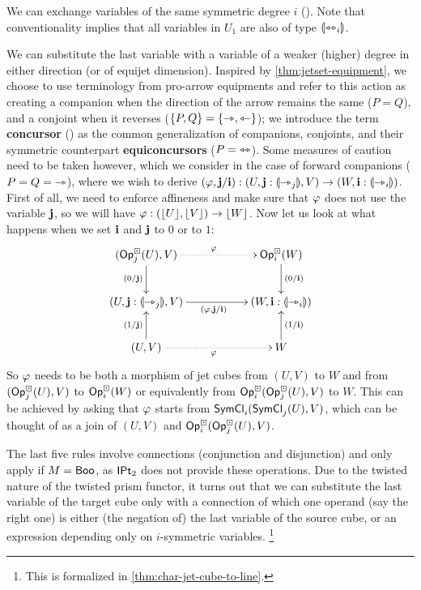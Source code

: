 \documentclass[a4paper]{memoir}
\begin{document}
We can exchange variables of the same symmetric degree $i$ ().
Note that conventionality implies that all variables in $U_1$ are also of type ${\llparenthesis \leftrightarrowtriangle_i \rrparenthesis}$.

We can substitute the last variable with a variable of a weaker (higher) degree in either direction (or of equijet dimension).
Inspired by \cref{thm:jetset-equipment}, we choose to use terminology from pro-arrow equipments and refer to this action as creating a companion when the direction of the arrow remains the same ($P = Q$), and a conjoint when it reverses ($\mathopen{}\left\{ P, Q \right\}\mathclose{} = \mathopen{}\left\{ \rightarrowtriangle, \leftarrowtriangle \right\}\mathclose{}$); we introduce the term \textbf{concursor} () as the common generalization of companions, conjoints, and their symmetric counterpart \textbf{equiconcursors} ($P = {\leftrightarrowtriangle}$).
Some measures of caution need to be taken however, which we consider in the case of forward companions ($P = Q = {\rightarrowtriangle}$), where we wish to derive $(\varphi, \mathbf{j} / \mathbf{i}) : (U, \mathbf{j} : {\llparenthesis \rightarrowtriangle_j \rrparenthesis}, V) \to (W, \mathbf{i} : {\llparenthesis \rightarrowtriangle_i \rrparenthesis})$.
First of all, we need to enforce affineness and make sure that $\varphi$ does not use the variable $\mathbf{j}$, so we will have $\varphi : (\mathopen{}\left\lfloor U \right\rfloor\mathclose{}, \mathopen{}\left\lfloor V \right\rfloor\mathclose{}) \to \mathopen{}\left\lfloor W \right\rfloor\mathclose{}$.
Now let us look at what happens when we set $\mathbf{i}$ and $\mathbf{j}$ to $0$ or to $1$:
\[
	\xymatrix{
		(\Opcube_j(U), V)
			\ar[d]_{(0/\dm j)}
			\ar@{.>}[rr]^\vfi
		&&
		\Opcube_i(W)
			\ar[d]^{(0/\dm i)}
		\\
		(U, \dm j : \rival{\jet_j}, V)
			\ar[rr]_{(\vfi, \dm j / \dm i)}
		&& (W, \dm i : \rival{\jet_i})
		\\
		(U, V)
			\ar[u]^{(1/\dm j)}
			\ar@{.>}[rr]_\vfi
		&&
		W
			\ar[u]_{(1/\dm i)}
	}
\]
So $\varphi$ needs to be both a morphism of jet cubes from $(U, V)$ to $W$ and from $({\mathsf{Op}}^\boxdot_j(U), V)$ to ${\mathsf{Op}}^\boxdot_i(W)$ or equivalently from ${\mathsf{Op}}^\boxdot_i({\mathsf{Op}}^\boxdot_j(U), V)$ to $W$. This can be achieved by asking that $\varphi$ starts from \allowbreak $\mathsf{SymCl}_i(\mathsf{SymCl}_j(U), V)$, which can be thought of as a join of $(U, V)$ and ${\mathsf{Op}}^\boxdot_i({\mathsf{Op}}^\boxdot_j(U), V)$.

The last five rules involve connections (conjunction and disjunction) and only apply if $M = \mathsf{Boo}$, as ${\mathsf{IPt}_2}$ does not provide these operations.
Due to the twisted nature of the twisted prism functor, it turns out that we can substitute the last variable of the target cube only with a connection of which one operand (say the right one) is either (the negation of) the last variable of the source cube, or an expression depending only on $i$-symmetric variables.%
\footnote{This is formalized in \cref{thm:char-jet-cube-to-line}.}
\end{document}
